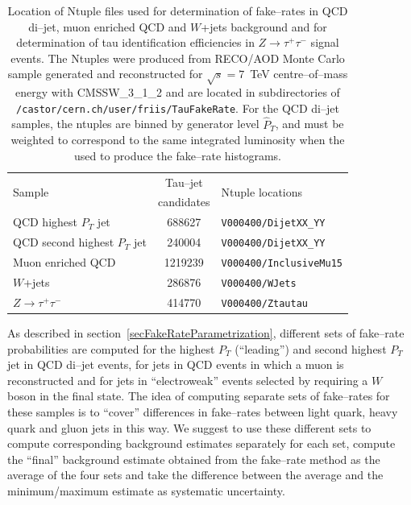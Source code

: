 \begin{table}[t]
\begin{center}
\tablesize
\begin{tabular}{|l|c|l|}
\hline
\multirow{2}{15mm}{Sample}  & Tau--jet   & \multirow{2}{35mm}{Ntuple locations} \\
                            & candidates & \\
\hline
QCD highest $P_{T}$ jet & 688627 & {\tt V000400/DijetXX\_YY} \\
\hline
QCD second highest $P_{T}$ jet & 240004 & {\tt V000400/DijetXX\_YY} \\
\hline
Muon enriched QCD & 1219239 & {\tt V000400/InclusiveMu15} \\
\hline
$W$+jets & 286876 & {\tt V000400/WJets} \\
\hline
$Z \rightarrow \tau^{+} \tau^{-}$ & 414770 & {\tt V000400/Ztautau} \\
\hline
\end{tabular}
\end{center}
\begin{center}
\caption{\captiontext Location of Ntuple files used for determination of fake--rates 
         in QCD di--jet, muon enriched QCD and $W$+jets background 
         and for determination of tau identification efficiencies 
         in $Z \rightarrow \tau^{+} \tau^{-}$ signal events.
         The Ntuples were produced from RECO/AOD Monte Carlo sample generated and reconstructed
	 for $\sqrt{s} = 7$~TeV centre--of--mass energy with CMSSW\_3\_1\_2 and are located in 
         subdirectories of {\tt /castor/cern.ch/user/friis/TauFakeRate}.  
         For the QCD di--jet samples, the ntuples are binned by generator level $\hat P_{T}$, 
         and must be weighted to correspond to the same integrated
         luminosity when the used to produce the fake--rate histograms.} 
\label{tabBgEstFakeRate_NtupleCastorLocations}
\end{center}
\end{table}

As described in section~\ref{secFakeRateParametrization}, different sets of
fake--rate probabilities are computed for the highest $P_{T}$ (``leading'') and
second highest $P_{T}$ jet in QCD di--jet events, for jets in QCD events in
which a muon is reconstructed and for jets in ``electroweak'' events selected by
requiring a $W$ boson in the final state.  The idea of computing separate sets
of fake--rates for these samples is to ``cover'' differences in fake--rates
between light quark, heavy quark and gluon jets in this way.  We suggest to use
these different sets to compute corresponding background estimates separately
for each set, compute the ``final'' background estimate obtained from the
fake--rate method as the average of the four sets and take the difference
between the average and the minimum/maximum estimate as systematic uncertainty.


